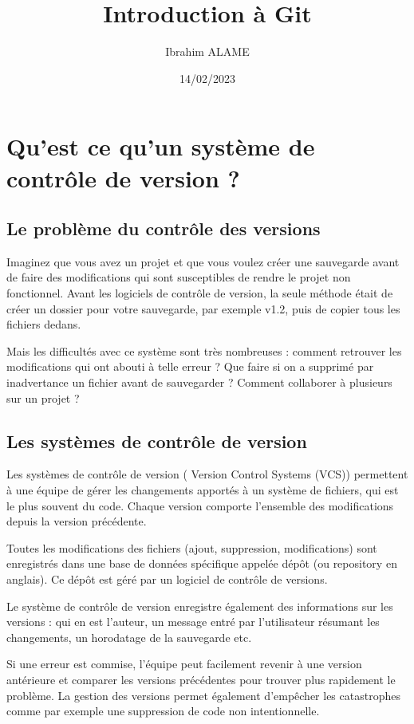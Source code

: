 \documentclass{article}
\title{Introduction à Git}
\author{Ibrahim ALAME}
\date{14/02/2023}
\begin{document}
\maketitle

\section{Qu'est ce qu'un système de contrôle de version ?}  
\subsection{Le problème du contrôle des versions}
Imaginez que vous avez un projet et que vous voulez créer une sauvegarde avant de faire des modifications qui sont susceptibles de rendre le projet non fonctionnel. Avant les logiciels de contrôle de version, la seule méthode était de créer un dossier pour votre sauvegarde, par exemple {\color{blue} v1.2}, puis de copier tous les fichiers dedans.

Mais les difficultés avec ce système sont très nombreuses : comment retrouver les modifications qui ont abouti à telle erreur ? Que faire si on a supprimé par inadvertance un fichier avant de sauvegarder ? Comment collaborer à plusieurs sur un projet ?

\subsection{Les systèmes de contrôle de version}
Les systèmes de contrôle de version ({\color{blue} Version Control Systems (VCS)}) permettent à une équipe de gérer les changements apportés à un système de fichiers, qui est le plus souvent du code. Chaque version comporte l'ensemble des modifications depuis la version précédente.

Toutes les modifications des fichiers (ajout, suppression, modifications) sont enregistrés dans une base de données spécifique appelée dépôt (ou {\color{blue} repository} en anglais). Ce dépôt est géré par un logiciel de contrôle de versions.

Le système de contrôle de version enregistre également des informations sur les versions : qui en est l'auteur, un message entré par l'utilisateur résumant les changements, un horodatage de la sauvegarde etc.

Si une erreur est commise, l'équipe peut facilement revenir à une version antérieure et comparer les versions précédentes pour trouver plus rapidement le problème. La gestion des versions permet également d'empêcher les catastrophes comme par exemple une suppression de code non intentionnelle.
\end{document}
